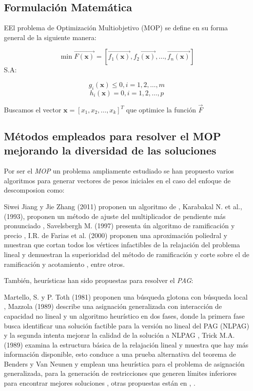 \documentclass[letterpaper,10pt]{article}
\begin{document}
\newpage
\subsection{Formulación Matemática}
EEl problema de Optimización Multiobjetivo (MOP) se define en su forma general de la siguiente manera:
 
$$\min \overrightarrow{F(\bm{x})} = \left[ \overrightarrow{f_1(\bm{x})}, \overrightarrow{f_2(\bm{x})} , \dots, \overrightarrow{f_n(\bm{x})} \right] $$
S.A:
 
$$g_i(\bm{x}) \leq 0, i=1,2,\dots,m$$
$$h_i(\bm{x}) = 0, i=1,2,\dots,p$$
 
Buscamos el vector $\bm{x}=[x_1,x_2,\dots,x_k]^T$ que optimice la función $\overrightarrow{F}$

 
\subsection{Métodos empleados para resolver el MOP mejorando la diversidad de las soluciones}

Por ser el \emph{MOP} un problema ampliamente estudiado se han propuesto varios algoritmos para generar vectores de pesos iniciales en el caso del enfoque de descomposion como:
\newline

Siwei Jiang y Jie Zhang (2011) proponen un algoritmo de  \cite{mie99}, Karabakal N. et al., (1993), proponen un método de ajuste del multiplicador de pendiente más pronunciado \cite{4358754}, Savelsbergh M. (1997) presenta ún algoritmo de ramificación y precio \cite{4358754}, I.R. de Farias et al. (2000) proponen una aproximación poliedral y muestran que cortan todos los vértices infactibles de la relajación del problema lineal y demuestran la superioridad del método de ramificación y corte sobre el de ramificación y acotamiento \cite{4358754}, entre otros.
\newline



También, heurísticas han sido propuestas para resolver el \emph{PAG}:
\newline

Martello, S. y P. Toth (1981) proponen una búsqueda glotona con búsqueda local \cite{4358754}, Mazzola (1989) describe una asignación generalizada con interacción de capacidad no lineal y un algoritmo heurístico en dos fases, donde la primera fase busca identificar una solución factible para la versión no lineal del PAG (NLPAG) y la segunda intenta mejorar la calidad de la solución a NLPAG  \cite{4358754}, Trick M.A. (1989) examina la estructura básica de la relajación lineal y muestra que hay más información disponible, esto conduce a una prueba alternativa del teorema de Benders y Van Neunen y emplean una heurística para el problema de asignación generalizada, para la generación de restricciones que generen límites inferiores para encontrar mejores soluciones \cite{4358754}, otras propuestas están en \cite{4358754}, \cite{4358754}.     
\newline
\end{document}
